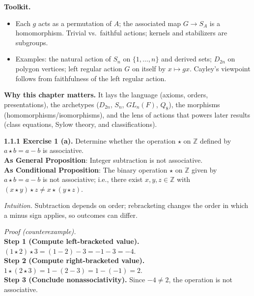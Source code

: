 \documentclass[12pt]{article}
\theoremstyle{definition}
\begin{document}
\textbf{Toolkit.}
\begin{itemize}\itemsep3pt
\item Each $g$ acts as a permutation of $A$; the associated map $G\to S_A$ is a homomorphism. Trivial vs.\ faithful actions; kernels and stabilizers are subgroups.
\item Examples: the natural action of $S_n$ on $\{1,\dots,n\}$ and derived sets; $D_{2n}$ on polygon vertices; left regular action $G$ on itself by $x\mapsto gx$. Cayley’s viewpoint follows from faithfulness of the left regular action.
\end{itemize}

\medskip
\noindent\textbf{Why this chapter matters.} It lays the language (axioms, orders, presentations), the archetypes ($D_{2n}$, $S_n$, $GL_n(F)$, $Q_8$), the morphisms (homomorphisms/isomorphisms), and the lens of actions that powers later results (class equations, Sylow theory, and classifications).

\newpage

\noindent \textbf{1.1.1 Exercise 1 (a).} Determine whether the operation $\star$ on $\mathbb{Z}$ defined by $a\star b=a-b$ is associative.\\ %

\noindent\textbf{As General Proposition}: Integer subtraction is not associative.\\

\noindent \textbf{As Conditional Proposition}: The binary operation $\star$ on $\mathbb{Z}$ given by $a\star b=a-b$ is not associative; i.e., there exist $x,y,z\in\mathbb{Z}$ with $(x\star y)\star z\neq x\star (y\star z)$.

\newpage

\dotfill

\emph{Intuition.} Subtraction depends on order; rebracketing changes the order in which a minus sign applies, so outcomes can differ.\\

\dotfill

\emph{Proof (counterexample).}\\
\textbf{Step 1 (Compute left-bracketed value).} $(1\star 2)\star 3=(1-2)-3=-1-3=-4$.\\
\textbf{Step 2 (Compute right-bracketed value).} $1\star(2\star 3)=1-(2-3)=1-(-1)=2$.\\
\textbf{Step 3 (Conclude nonassociativity).} Since $-4\neq 2$, the operation is not associative.\\


\newpage
\end{document}
